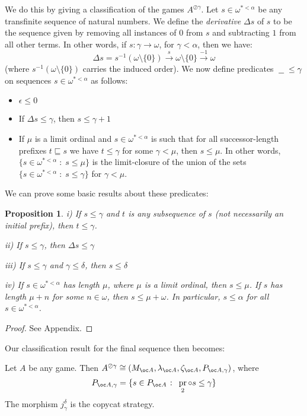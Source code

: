 \documentclass[a4paper,UKenglish]{lipics-v2016}
\theoremstyle{plain}
\newtheorem{proposition}[theorem]{Proposition}
\theoremstyle{definition}
\newcommand*\from{\colon}
\def \inv {^{-1}}
\DeclareMathOperator{\pr}{pr}
\newcommand{\sequoid}{\oslash}
\newcommand{\suchthat}{\;\colon\;}
\newcommand{\emptyplay}{\epsilon}
\newcommand{\prefix}{\sqsubseteq}
\newcommand{\blank}{\;\underline{\hspace{1.5ex}}\;}
\newlength{\arrow}
\begin{document}
We do this by giving a classification of the games $A^{\sequoid\gamma}$.  Let $s\in\omega^{*<\alpha}$ be any transfinite sequence of natural numbers.  We define the \emph{derivative} $\Delta s$ of $s$ to be the sequence given by removing all instances of $0$ from $s$ and subtracting $1$ from all other terms.  In other words, if $s\from\gamma\to\omega$, for $\gamma<\alpha$, then we have:
\[
  \Delta s = s\inv(\omega\setminus\{0\})\xrightarrow{s}\omega\setminus\{0\}\xrightarrow{-1}\omega
  \]
(where $s\inv(\omega\setminus\{0\})$ carries the induced order).  We now define predicates $\blank\le\gamma$ on sequences $s\in \omega^{*<\alpha}$ as follows:
\begin{itemize}
  \item $\emptyplay\le 0$
  \item If $\Delta s\le\gamma$, then $s\le\gamma+1$
  \item If $\mu$ is a limit ordinal and $s\in\omega^{*<\alpha}$ is such that for all successor-length prefixes $t\prefix s$ we have $t\le\gamma$ for some $\gamma<\mu$, then $s\le\mu$.  In other words, $\{s\in \omega^{*<\alpha}\suchthat s\le\mu\}$ is the limit-closure of the union of the sets $\{s\in\omega^{*<\alpha}\suchthat s\le\gamma\}$ for $\gamma<\mu$.
\end{itemize}

We can prove some basic results about these predicates:
\begin{proposition}\label{basicResultsAboutRank}
  i) If $s\le\gamma$ and $t$ is any subsequence of $s$ (not necessarily an initial prefix), then $t\le\gamma$.
  
  ii) If $s\le\gamma$, then $\Delta s\le\gamma$

  iii) If $s\le\gamma$ and $\gamma\le\delta$, then $s\le\delta$

  iv) If $s\in\omega^{*<\alpha}$ has length $\mu$, where $\mu$ is a limit ordinal, then $s\le\mu$.  If $s$ has length $\mu+n$ for some $n\in\omega$, then $s\le\mu+\omega$.  In particular, $s\le\alpha$ for all $s\in \omega^{*<\alpha}$.  
\end{proposition}

\begin{proof}
  See Appendix.
\end{proof}

Our classification result for the final sequence then becomes:
\begin{theorem}\label{finalseqClassification}
  Let $A$ be any game.  Then $A^{\sequoid\gamma}\cong(M_{\oc A}, \lambda_{\oc A}, \zeta_{\oc A}, P_{\oc A,\gamma})$, where
  \[
    P_{\oc A,\gamma} = \{s\in P_{\oc A}\suchthat \pr_2\circ s\le\gamma\}
    \]
  The morphism $j_\gamma^\delta$ is the copycat strategy.
\end{theorem}
\end{document}
